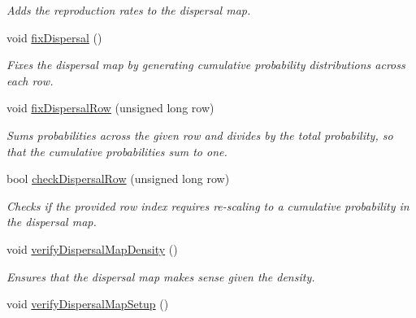 \begin{DoxyCompactItemize}
\begin{DoxyCompactList}\small\item\em Adds the reproduction rates to the dispersal map. \end{DoxyCompactList}\item 
void \hyperlink{class_dispersal_coordinator_a588b959feff178953c37bfeae7aa8529}{fix\+Dispersal} ()\hypertarget{class_dispersal_coordinator_a588b959feff178953c37bfeae7aa8529}{}\label{class_dispersal_coordinator_a588b959feff178953c37bfeae7aa8529}

\begin{DoxyCompactList}\small\item\em Fixes the dispersal map by generating cumulative probability distributions across each row. \end{DoxyCompactList}\item 
void \hyperlink{class_dispersal_coordinator_a7fc1c7f99cb2ac16ae97c78876eb69ab}{fix\+Dispersal\+Row} (unsigned long row)
\begin{DoxyCompactList}\small\item\em Sums probabilities across the given row and divides by the total probability, so that the cumulative probabilities sum to one. \end{DoxyCompactList}\item 
bool \hyperlink{class_dispersal_coordinator_a8e3c496ef1ad36844368bc9d2dd68757}{check\+Dispersal\+Row} (unsigned long row)
\begin{DoxyCompactList}\small\item\em Checks if the provided row index requires re-\/scaling to a cumulative probability in the dispersal map. \end{DoxyCompactList}\item 
void \hyperlink{class_dispersal_coordinator_a3c06336711cae0b250992ce6f539d8c1}{verify\+Dispersal\+Map\+Density} ()\hypertarget{class_dispersal_coordinator_a3c06336711cae0b250992ce6f539d8c1}{}\label{class_dispersal_coordinator_a3c06336711cae0b250992ce6f539d8c1}

\begin{DoxyCompactList}\small\item\em Ensures that the dispersal map makes sense given the density. \end{DoxyCompactList}\item 
void \hyperlink{class_dispersal_coordinator_af3c9c634367050476ed17ec7dd85c885}{verify\+Dispersal\+Map\+Setup} ()\hypertarget{class_dispersal_coordinator_af3c9c634367050476ed17ec7dd85c885}{}\label{class_dispersal_coordinator_af3c9c634367050476ed17ec7dd85c885}


\end{DoxyCompactItemize}
